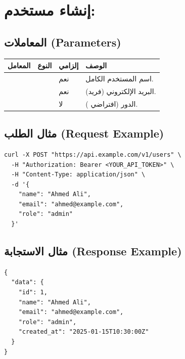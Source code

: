 \documentclass[11pt,a4paper]{article}
\begin{document}
\section{إنشاء مستخدم: }
\label{sec:ep-post-users}

\subsection{المعاملات (Parameters)}
\begin{table}[H]
\centering
\renewcommand{\arraystretch}{1.3}
\begin{tabularx}{\textwidth}{L{3cm} C{2cm} C{2cm} X}
\toprule
\textbf{المعامل} & \textbf{النوع} & \textbf{إلزامي} & \textbf{الوصف} \\
\midrule
{}  &   & نعم & اسم المستخدم الكامل. \\
 &   & نعم & البريد الإلكتروني (فريد). \\
  &   & لا  & الدور (افتراضي ). \\
\bottomrule
\end{tabularx}
\end{table}

\subsection{مثال الطلب (Request Example)}
\begin{english}
\begin{lstlisting}[]
curl -X POST "https://api.example.com/v1/users" \
  -H "Authorization: Bearer <YOUR_API_TOKEN>" \
  -H "Content-Type: application/json" \
  -d '{
    "name": "Ahmed Ali",
    "email": "ahmed@example.com",
    "role": "admin"
  }'
\end{lstlisting}
\end{english}

\subsection{مثال الاستجابة (Response Example)}
\begin{english}
\begin{lstlisting}[]
{
  "data": {
    "id": 1,
    "name": "Ahmed Ali",
    "email": "ahmed@example.com",
    "role": "admin",
    "created_at": "2025-01-15T10:30:00Z"
  }
}
\end{lstlisting}
\end{english}
\end{document}

